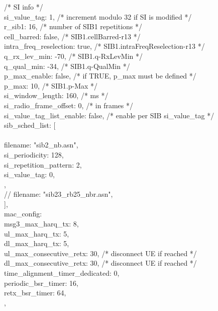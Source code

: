 {{      /* SI info */\\
      si\_value\_tag: 1, /* increment modulo 32 if SI is modified */\\
      r\_sib1: 16, /* number of SIB1 repetitions */\\
      cell\_barred: false, /* SIB1.cellBarred-r13 */\\
      intra\_freq\_reselection: true, /* SIB1.intraFreqReselection-r13 */\\
      q\_rx\_lev\_min: -70, /* SIB1.q-RxLevMin */\\
      q\_qual\_min: -34, /* SIB1.q-QualMin */\\
      p\_max\_enable: false, /* if TRUE, p\_max must be defined */\\
      p\_max: 10, /* SIB1.p-Max */\\
      
      si\_window\_length: 160, /* ms */\\
      si\_radio\_frame\_offset: 0, /* in frames */\\
      si\_value\_tag\_list\_enable: false, /* enable per SIB si\_value\_tag */\\

      sib\_sched\_list: [\\
      { \\
          filename: "sib2\_nb.asn",\\
          si\_periodicity: 128,\\
          si\_repetition\_pattern: 2,\\
          si\_value\_tag: 0,\\
        },\\
	//{ filename: "sib23\_rb25\_nbr.asn",}\\
      ],\\
      
      mac\_config: {\\
        msg3\_max\_harq\_tx: 8,\\
        ul\_max\_harq\_tx: 5,\\
        dl\_max\_harq\_tx: 5,\\
        ul\_max\_consecutive\_retx: 30, /* disconnect UE if reached */\\
        dl\_max\_consecutive\_retx: 30, /* disconnect UE if reached */\\
        time\_alignment\_timer\_dedicated: 0,\\
        periodic\_bsr\_timer: 16,\\
        retx\_bsr\_timer: 64,\\
      },\\

}}
